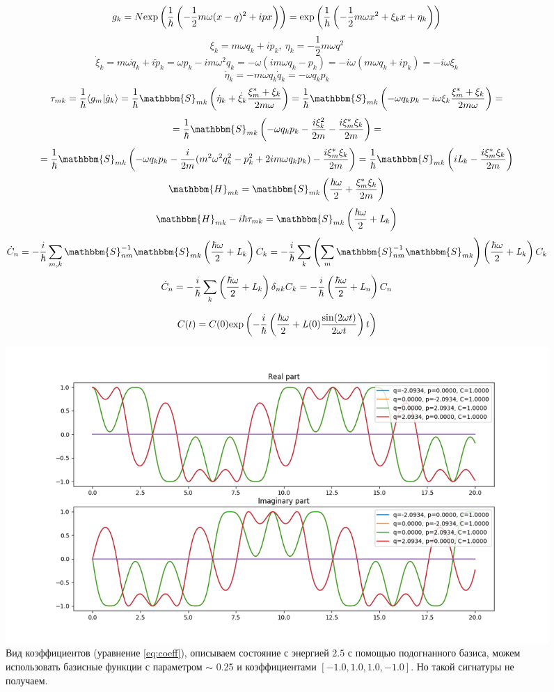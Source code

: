 $$g_k=N\myexp{\frac{1}{\hbar}\left(-\frac{1}{2}m\omega(x-q)^2+ipx\right)}=%
       \myexp{\frac{1}{\hbar}\left(-\frac{1}{2}m\omega x^2 + \xi_kx + \eta_k\right)}$$
$$\xi_k=m\omega q_k+ip_k,\ \eta_k=-\frac{1}{2}m\omega q^2$$
$$\dot{\xi}_k=m\omega\dot{q}_k+i\dot{p}_k=\omega p_k-im\omega^2q_k=-\omega(im\omega q_k - p_k)=-i\omega(m\omega q_k+ip_k)=-i\omega\xi_k$$
$$\dot{\eta}_k=-m\omega q_k\dot{q}_k=-\omega q_kp_k$$
$$\tau_{mk}=\frac{1}{\hbar}\myint{g_m}{\dot{g}_k}=%
				   \frac{1}{\hbar}\mathbbm{S}_{mk}\left(\dot{\eta}_k+\dot{\xi}_k\frac{\xi_m^*+\xi_k}{2m\omega}\right)=%
				   \frac{1}{\hbar}\mathbbm{S}_{mk}\left(-\omega q_kp_k-i\omega\xi_k\frac{\xi_m^*+\xi_k}{2m\omega}\right)=$$
$$=\frac{1}{\hbar}\mathbbm{S}_{mk}\left(-\omega q_kp_k-\frac{i\xi_k^2}{2m}-\frac{i\xi_m^*\xi_k}{2m}\right)=$$
$$=\frac{1}{\hbar}\mathbbm{S}_{mk}\left(-\omega q_kp_k-\frac{i}{2m}(m^2\omega^2q_k^2-p_k^2+2im\omega q_kp_k)-%
					 \frac{i\xi_m^*\xi_k}{2m}\right)=%
\frac{1}{\hbar}\mathbbm{S}_{mk}\left(i\myl_k-\frac{i\xi_m^*\xi_k}{2m}\right)$$
$$\mathbbm{H}_{mk}=\mathbbm{S}_{mk}\left(\frac{\hbar\omega}{2}+\frac{\xi_m^*\xi_k}{2m}\right)$$
$$\mathbbm{H}_{mk}-i\hbar\tau_{mk}=\mathbbm{S}_{mk}\left(\frac{\hbar\omega}{2}+\myl_k\right)$$
$$\dot{C}_n=-\frac{i}{\hbar}\sum_{m,k}\mathbbm{S}_{nm}^{-1}\mathbbm{S}_{mk}\left(\frac{\hbar\omega}{2}+\myl_k\right)C_k=%
	    -\frac{i}{\hbar}\sum_k\left(\sum_m\mathbbm{S}_{nm}^{-1}\mathbbm{S}_{mk}\right)%
				  \left(\frac{\hbar\omega}{2}+\myl_k\right)C_k$$
$$\dot{C}_n=-\frac{i}{\hbar}\sum_k\left(\frac{\hbar\omega}{2}+\myl_k\right)\delta_{nk}C_k=%
	    -\frac{i}{\hbar}\left(\frac{\hbar\omega}{2}+\myl_n\right)C_n$$

\begin{equation}
C(t)=C(0)\text{exp}\left( -\frac{i}{\hbar}\left(\frac{\hbar\omega}{2}+\mathit{L}(0)\frac{\sin(2\omega t)}{2\omega t}\right)t \right)
\label{eq:coeff}
\end{equation}
\begin{figure}[H]
\includegraphics[scale=0.5]{eq_coeff_1.png}
\caption{Вид коэффициентов (уравнение \ref{eq:coeff}), описываем состояние с энергией $2.5$ с помощью подогнанного базиса, %
	 можем использовать базисные функции с параметром $\sim$ 0.25 и коэффициентами $[-1.0, 1.0, 1.0, -1.0]$. %
	 Но такой сигнатуры не получаем. }
\end{figure}

